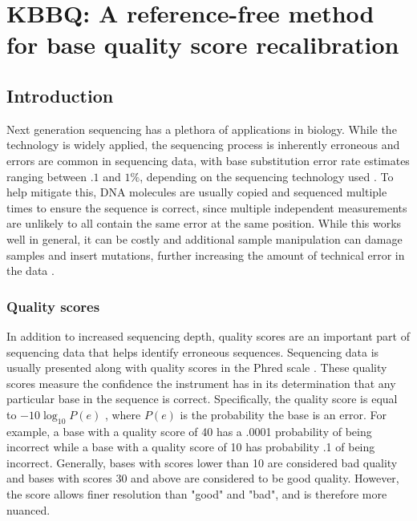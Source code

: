 \chapter{KBBQ: A reference-free method for base quality score recalibration}
\label{ch:kbbq}
\section{Introduction}

Next generation sequencing has a plethora of applications in biology. %
While the technology is widely applied, the sequencing process is inherently erroneous and errors are common in sequencing data, with base substitution error rate estimates ranging between $.1$ and $1\%$, depending on the sequencing technology used \parencite{fox_accuracy_2014}.
To help mitigate this, DNA molecules are usually copied and sequenced multiple times to ensure the sequence is correct, since multiple independent measurements are unlikely to all contain the same error at the same position. While this works well in general, it can be costly and additional sample manipulation can damage samples and insert mutations, further increasing the amount of technical error in the data \parencite{schirmer_insight_2015, ma_analysis_2019}.

\subsection{Quality scores}

In addition to increased sequencing depth, quality scores are an important part of sequencing data that helps identify erroneous sequences. Sequencing data is usually presented along with quality scores in the Phred scale \parencite{ewing_base-calling_1998, ewing_base-calling_1998-1}.
These quality scores measure the confidence the instrument has in its determination that any particular base in the sequence is correct.
Specifically, the quality score is equal to $-10\log_{10}P(e)$ \parencite{ewing_base-calling_1998} \parencite{ewing_base-calling_1998-1}, where $P(e)$ is the probability the base is an error.
For example, a base with a quality score of 40 has a .0001 probability of being incorrect while a base with a quality score of 10 has probability .1 of being incorrect. Generally, bases with scores lower than 10 are considered bad quality and bases with scores 30 and above are considered to be good quality. However, the score allows finer resolution than "good" and "bad", and is therefore more nuanced.

